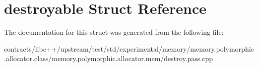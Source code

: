 \hypertarget{structdestroyable}{}\section{destroyable Struct Reference}
\label{structdestroyable}


The documentation for this struct was generated from the following file\+:\begin{DoxyCompactItemize}
\item 
contracts/libc++/upstream/test/std/experimental/memory/memory.\+polymorphic.\+allocator.\+class/memory.\+polymorphic.\+allocator.\+mem/destroy.\+pass.\+cpp\end{DoxyCompactItemize}
